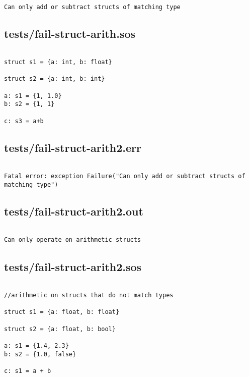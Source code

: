 \documentclass[main.tex]{subfiles}
\begin{document}
\begin{lstlisting}

Can only add or subtract structs of matching type
\end{lstlisting}

\subsection{tests/fail-struct-arith.sos}

\begin{lstlisting}

struct s1 = {a: int, b: float}

struct s2 = {a: int, b: int}

a: s1 = {1, 1.0}
b: s2 = {1, 1}

c: s3 = a+b
\end{lstlisting}

\subsection{tests/fail-struct-arith2.err}

\begin{lstlisting}

Fatal error: exception Failure("Can only add or subtract structs of matching type")
\end{lstlisting}

\subsection{tests/fail-struct-arith2.out}

\begin{lstlisting}

Can only operate on arithmetic structs
\end{lstlisting}

\subsection{tests/fail-struct-arith2.sos}

\begin{lstlisting}

//arithmetic on structs that do not match types

struct s1 = {a: float, b: float}

struct s2 = {a: float, b: bool}

a: s1 = {1.4, 2.3}
b: s2 = {1.0, false}

c: s1 = a + b

\end{lstlisting}
\end{document}
